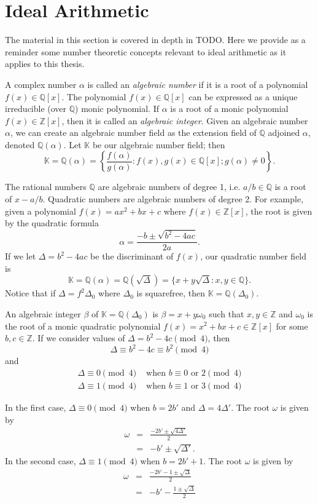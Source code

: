 \documentclass[11pt, letterpaper]{book}
\theoremstyle{definition}
\newcommand{\KK}{\mathbb{K}}
\newcommand{\ZZ}{\mathbb{Z}}
\newcommand{\QQ}{\mathbb{Q}}
\begin{document}
\setcounter{chapter}{1}
\chapter{Ideal Arithmetic}


The material in this section is covered in depth in TODO.  Here we provide as a reminder some number theoretic concepts relevant to ideal arithmetic as it applies to this thesis.


\bigbreak
A complex number $\alpha$ is called an \emph{algebraic number} if it is a root of a polynomial $f(x) \in \QQ[x]$.  The polynomial $f(x) \in \QQ[x]$ can be expressed as a unique irreducible (over $\QQ$) monic polynomial.  If $\alpha$ is a root of a monic polynomial $f(x) \in \ZZ[x]$, then it is called an \emph{algebraic integer}.  Given an algebraic number $\alpha$, we can create an algebraic number field as the extension field of $\QQ$ adjoined $\alpha$, denoted $\QQ(\alpha)$. Let $\KK$ be our algebraic number field; then
\[
	\KK = \QQ(\alpha) = \left\{ \frac{f(\alpha)}{g(\alpha)} : f(x), g(x) \in \QQ[x]; g(\alpha) \ne 0 \right\}.
\]


\bigbreak
The rational numbers $\QQ$ are algebraic numbers of degree 1, i.e. $a/b \in \QQ$ is a root of $x - a/b$.  Quadratic numbers are algebraic numbers of degree 2.  For example, given a polynomial $f(x) = ax^2 + bx + c$ where $f(x) \in \ZZ[x]$, the root is given by the quadratic formula
\[
	\alpha = \frac{-b \pm \sqrt{b^2 - 4ac}}{2a}.
\]
If we let $\Delta = b^2 -4ac$ be the discriminant of $f(x)$, our quadratic number field is 
\[
	\KK = \QQ(\alpha) = \QQ(\sqrt{\Delta}) = \{x + y\sqrt{\Delta} : x,y \in \QQ\}.
\]
Notice that if $\Delta = f^2 \Delta_0$ where $\Delta_0$ is squarefree, then $\KK = \QQ(\Delta_0)$.  


\bigbreak
An algebraic integer $\beta$ of $\KK = \QQ(\Delta_0)$ is $\beta = x+y \omega_0$ such that $x, y \in \ZZ$ and $\omega_0$ is the root of a monic quadratic polynomial $f(x) = x^2+bx+c \in \ZZ[x]$ for some $b,c \in \ZZ$.  If we consider values of $\Delta = b^2-4c \pmod 4$, then
\[
	\Delta \equiv b^2-4c \equiv b^2 \pmod 4
\]
and
\begin{eqnarray*}
		\Delta \equiv 0 \pmod 4 & \textrm{ when } b \equiv 0 \textrm{ or } 2 \pmod 4 \\
		\Delta \equiv 1 \pmod 4 & \textrm{ when } b \equiv 1 \textrm{ or } 3 \pmod 4
\end{eqnarray*}

In the first case, $\Delta \equiv 0 \pmod 4$ when $b=2b'$ and $\Delta = 4\Delta'$.  The root $\omega$ is given by
\begin{eqnarray*}
	\omega & = & \frac{-2b' \pm \sqrt{4\Delta'}}{2} \\
	& = & -b' \pm \sqrt{\Delta'}.
\end{eqnarray*}
In the second case, $\Delta \equiv 1 \pmod 4$ when $b=2b'+1$.  The root $\omega$ is given by
\begin{eqnarray*}
	\omega & = & \frac{-2b'-1 \pm \sqrt{\Delta}}{2} \\
	& = & -b' - \frac{1 \pm \sqrt{\Delta}}{2}
\end{eqnarray*}
\end{document}
